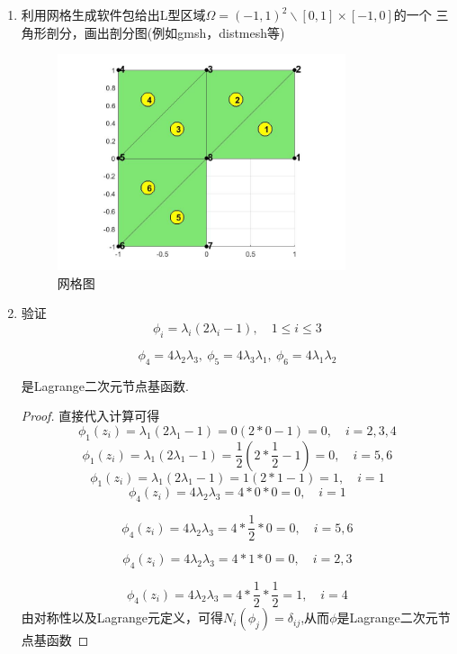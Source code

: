 \documentclass[12pt,a4paper]{article}
\begin{document}
\begin{enumerate}
\begin{proof}[证明]
			由于 $C=B^\top$, (a) 等价于 (b).
			
		\end{proof}
		\item 利用网格生成软件包给出L型区域$\Omega=(-1,1)^2\backslash[0,1]\times[-1,0]$的一个
		三角形剖分，画出剖分图(例如gmsh，distmesh等)
		
		\begin{figure}[ht]
			\centering
			\includegraphics[width=0.8\textwidth]{hw3_2.jpg}
			\caption{网格图}
			\label{fig:triangelmesh}
		\end{figure}
		
		\item 验证
		$$
		\phi_i=\lambda_i(2\lambda_i-1),\quad1\leq i\leq3
		$$
		
		$$
		\phi_4=4\lambda_2\lambda_3,\:\phi_5=4\lambda_3\lambda_1,\:\phi_6=4\lambda_1\lambda_2
		$$
		
		是Lagrange二次元节点基函数. 
		
		\begin{proof}
			直接代入计算可得
			$$
			\phi_1(z_i)=\lambda_1(2\lambda_1-1)=0(2*0-1)=0, \quad i = 2,3,4
			$$
			$$
			\phi_1(z_i)=\lambda_1(2\lambda_1-1)=\frac{1}{2}(2*\frac{1}{2}-1)=0, \quad i = 5,6
			$$
			$$
			\phi_1(z_i)=\lambda_1(2\lambda_1-1)=1(2*1-1)=1, \quad i = 1
			$$
			$$
			\phi_4(z_i)=4\lambda_2\lambda_3=4*0*0=0, \quad i = 1
			$$
			
			$$
			\phi_4(z_i)=4\lambda_2\lambda_3=4*\frac{1}{2}*0=0, \quad i = 5,6
			$$
			
			$$
			\phi_4(z_i)=4\lambda_2\lambda_3=4*1*0=0, \quad i = 2,3
			$$
			
			$$
			\phi_4(z_i)=4\lambda_2\lambda_3=4*\frac{1}{2}*\frac{1}{2}=1, \quad i = 4
			$$
			由对称性以及Lagrange元定义，可得$N_i(\phi_j)=\delta_{ij}$,从而$\phi$是Lagrange二次元节点基函数
		\end{proof}
		

\end{enumerate}
\end{document}
